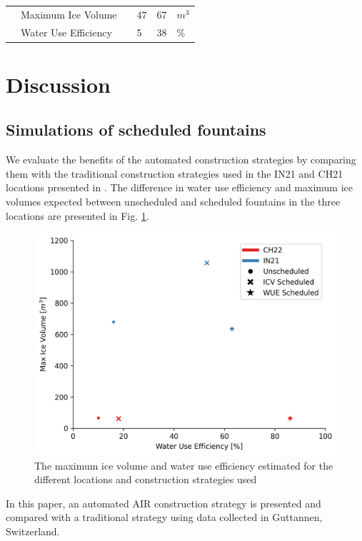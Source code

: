 \documentclass[tc, manuscript]{copernicus}
\begin{document}
\begin{table}
\begin{tabular}{@{}|llllll|@{}}
		                       & Maximum Ice Volume              &                 & 47            & 67            & $m^{3}$ \\
		\multicolumn{1}{|l|}{} & Water Use Efficiency            &                 & 5             & 38            & \% \\\midrule
	\end{tabular}
\end{table}

\section{Discussion}

\subsection{Simulations of scheduled fountains}

We evaluate the benefits of the automated construction strategies by comparing them with the traditional
construction strategies used in the IN21 and CH21 locations presented in
\cite{balasubramanianInfluenceMeteorologicalConditions2022}. The difference in water use efficiency and maximum
ice volumes expected between unscheduled and scheduled fountains in the three locations are presented in Fig.
\ref{fig:wue}.

\begin{figure}[t]
\includegraphics[width=12cm]{Figures/wue.png}
\caption{The maximum ice volume and water use efficiency estimated for the different locations and construction
strategies used}
\label{fig:wue}
\end{figure}


\conclusions
In this paper, an automated AIR construction strategy is presented and compared with a traditional strategy
using data collected in Guttannen, Switzerland.
\end{document}
